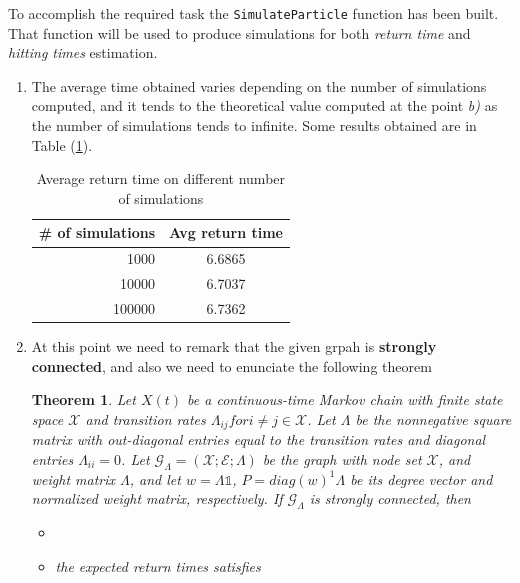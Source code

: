 \documentclass[
	12pt, %
]{fphw}
\newtheorem{theorem}{Theorem}
\begin{document}
To accomplish the required task the \texttt{SimulateParticle} function has been built. That function will be used to produce simulations for both \emph{return time} and \emph{hitting times} estimation. 
\begin{enumerate}[(a\normalfont)]
    \item The average time obtained varies depending on the number of simulations computed, and it tends to the theoretical value computed at the point \emph{b)} as the number of simulations tends to infinite. 
    Some results obtained are in Table (\ref{tab:P1ReturnTimes}).
    
    \begin{table}[H]
      \begin{center}
        \begin{tabular}{r|c} 
          \textbf{\# of simulations} & \textbf{Avg return time}\\
          \hline
          1000 & 6.6865 \\
          10000 & 6.7037 \\
          100000 & 6.7362 \\
        \end{tabular}
      \end{center}
      \caption{Average return time on different number of simulations}
      \label{tab:P1ReturnTimes}
    \end{table}
    \item At this point we need to remark that the given grpah is \textbf{strongly connected}, and also we need to enunciate the following theorem
    \begin{theorem}\label{theo:P1ExpectedReturnTheo}
        Let $X(t)$ be a continuous-time Markov chain with finite state space $\mathcal{X}$ and transition rates $\Lambda_{ij} for i \neq j \in \mathcal{X}$. Let $\Lambda$ be the nonnegative square matrix with out-diagonal entries equal to the transition rates and diagonal entries $\Lambda_{ii} = 0$. 
        Let $\mathcal{G}_{\Lambda} = (\mathcal{X}; \mathcal{E}; \Lambda)$ be the graph with node set $\mathcal{X}$, and weight matrix $\Lambda$, and let $w = \Lambda \mathds{1}$, $P = diag(w)^1\Lambda$ be its degree vector and normalized weight matrix, respectively. 
        If $\mathcal{G}_{\Lambda}$ is strongly connected, then
        \begin{itemize}
            \item[...]
            \item[(iv)] the expected return times satisfies
            \begin{equation}\label{eq:ExpectedReturnTimesTheo}

\end{equation}
\end{itemize}
\end{theorem}
\end{enumerate}
\end{document}
